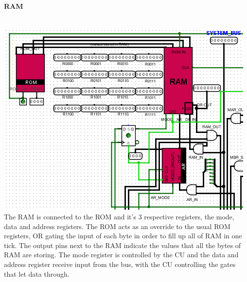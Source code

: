 \documentclass{mcgillhomework}
\begin{document}
	\paragraph{RAM}~
	\\ \includegraphics[scale=0.5]{RAM} \\The RAM is connected to the ROM and it's $3$ respective registers, the mode, data and address registers. The ROM acts as an override to the usual ROM registers, OR gating the input of each byte in order to fill up all of RAM in one tick. The output pins next to the RAM indicate the values that all the bytes of RAM are storing. The mode register is controlled by the CU and the data and address register receive input from the bus, with the CU controlling the gates that let data through.
\end{document}
